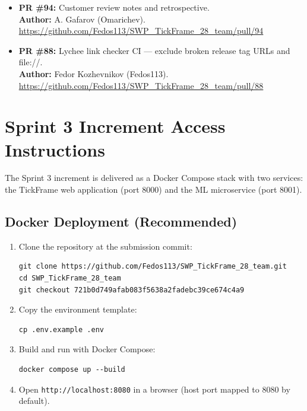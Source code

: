 \documentclass[11pt,a4paper]{article}
\begin{document}
\begin{itemize}[leftmargin=*]
    \item \textbf{PR \#94:} Customer review notes and retrospective. \\
          \textbf{Author:} A. Gafarov (Omarichev). \\
          \url{https://github.com/Fedos113/SWP_TickFrame_28_team/pull/94}

    \item \textbf{PR \#88:} Lychee link checker CI --- exclude broken release tag URLs and file://. \\
          \textbf{Author:} Fedor Kozhevnikov (Fedos113). \\
          \url{https://github.com/Fedos113/SWP_TickFrame_28_team/pull/88}

\end{itemize}

\section{Sprint 3 Increment Access Instructions}

The Sprint 3 increment is delivered as a Docker Compose stack with two services: the TickFrame web application (port 8000) and the ML microservice (port 8001).

\subsection{Docker Deployment (Recommended)}

\begin{enumerate}[leftmargin=*]
    \item Clone the repository at the submission commit:
\begin{verbatim}
git clone https://github.com/Fedos113/SWP_TickFrame_28_team.git
cd SWP_TickFrame_28_team
git checkout 721b0d749afab083f5638a2fadebc39ce674c4a9
\end{verbatim}

    \item Copy the environment template:
\begin{verbatim}
cp .env.example .env
\end{verbatim}

    \item Build and run with Docker Compose:
\begin{verbatim}
docker compose up --build
\end{verbatim}

    \item Open \texttt{http://localhost:8080} in a browser (host port mapped to 8080 by default).
\end{enumerate}
\end{document}
